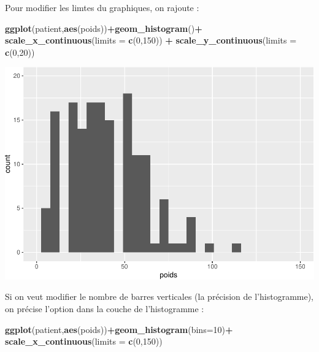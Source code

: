 \documentclass[
]{book}
\newenvironment{Shaded}{\begin{snugshade}}{\end{snugshade}}
\newcommand{\AttributeTok}[1]{\textcolor[rgb]{0.13,0.29,0.53}{#1}}
\newcommand{\DecValTok}[1]{\textcolor[rgb]{0.00,0.00,0.81}{#1}}
\newcommand{\FunctionTok}[1]{\textcolor[rgb]{0.13,0.29,0.53}{\textbf{#1}}}
\newcommand{\NormalTok}[1]{#1}
\newcommand{\SpecialCharTok}[1]{\textcolor[rgb]{0.81,0.36,0.00}{\textbf{#1}}}
\begin{document}
Pour modifier les limtes du graphiques, on rajoute :

\begin{Shaded}
\begin{Highlighting}[]
\FunctionTok{ggplot}\NormalTok{(patient,}\FunctionTok{aes}\NormalTok{(poids))}\SpecialCharTok{+}\FunctionTok{geom\_histogram}\NormalTok{()}\SpecialCharTok{+}
  \FunctionTok{scale\_x\_continuous}\NormalTok{(}\AttributeTok{limits =} \FunctionTok{c}\NormalTok{(}\DecValTok{0}\NormalTok{,}\DecValTok{150}\NormalTok{)) }\SpecialCharTok{+}
  \FunctionTok{scale\_y\_continuous}\NormalTok{(}\AttributeTok{limits =} \FunctionTok{c}\NormalTok{(}\DecValTok{0}\NormalTok{,}\DecValTok{20}\NormalTok{))}
\end{Highlighting}
\end{Shaded}

\includegraphics{_main_files/figure-latex/ggplot4-1.pdf}

Si on veut modifier le nombre de barres verticales (la précision de l'histogramme),
on précise l'option dans la couche de l'histogramme :

\begin{Shaded}
\begin{Highlighting}[]
\FunctionTok{ggplot}\NormalTok{(patient,}\FunctionTok{aes}\NormalTok{(poids))}\SpecialCharTok{+}\FunctionTok{geom\_histogram}\NormalTok{(}\AttributeTok{bins=}\DecValTok{10}\NormalTok{)}\SpecialCharTok{+}
  \FunctionTok{scale\_x\_continuous}\NormalTok{(}\AttributeTok{limits =} \FunctionTok{c}\NormalTok{(}\DecValTok{0}\NormalTok{,}\DecValTok{150}\NormalTok{))}
\end{Highlighting}
\end{Shaded}
\end{document}
